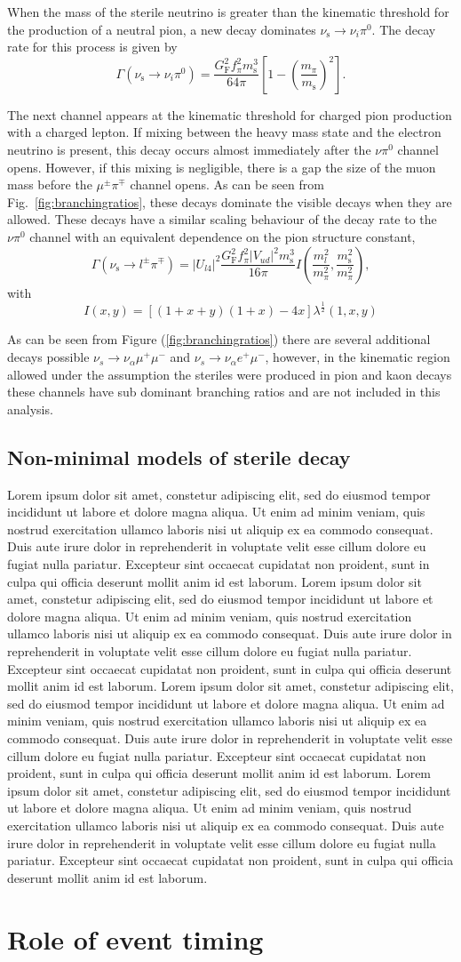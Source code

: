 \documentclass[11pt, a4paper]{article}
\newcommand{\reffig}[1]{Fig.~\ref{#1}}
\newcommand{\lorem}{ \textcolor[rgb]{0.8,0.8,0.8}{Lorem ipsum dolor sit amet, constetur
adipiscing elit, sed do eiusmod tempor incididunt ut labore et dolore magna
aliqua. Ut enim ad minim veniam, quis nostrud exercitation ullamco laboris nisi
ut aliquip ex ea commodo consequat. Duis aute irure dolor in reprehenderit in
voluptate velit esse cillum dolore eu fugiat nulla pariatur. Excepteur sint
occaecat cupidatat non proident, sunt in culpa qui officia deserunt mollit anim
id est laborum.}}
\begin{document}
When the mass of the sterile neutrino is greater than the kinematic threshold
for the production of a neutral pion, a new decay dominates
$\nu_\text{s}\to\nu_i \pi^0$. The decay rate for this process is given by
%
\[ \Gamma\left(\nu_\text{s} \to \nu_i \pi^0\right) =
\frac{G_\text{F}^2f_\pi^2m_\text{s}^3}{64\pi} \left[1-\left(
\frac{m_\pi}{m_\text{s}} \right)^2\right].  \]

The next channel appears at the kinematic threshold for charged pion production
with a charged lepton. If mixing between the heavy mass state and the electron
neutrino is present, this decay occurs almost immediately after the $\nu\pi^0$
channel opens. However, if this mixing is negligible, there is a gap the size of
the muon mass before the $\mu^\pm\pi^\mp$ channel opens. As can be seen from
\reffig{fig:branchingratios}, these decays dominate the visible decays when
they are allowed. These decays have a similar scaling behaviour of the decay
rate to the $\nu\pi^0$ channel with an equivalent dependence on the pion
structure constant,
%
\[ \Gamma\left(\nu_\text{s} \to l^\pm\pi^\mp\right) =
	\left|U_{l4}\right|^2\frac{G_\text{F}^2f_\pi^2 |V_{ud}|^2  m_\text{s}^3}{16\pi}I\left(\frac{m_l^2}{m_\pi^2} , \frac{m_\text{s}^2}{m_\pi^2}\right) ,
\]
with 
\[
	I(x,y) = \left[ \left( 1+x+y\right) \left(1+x\right) -4 x\right] \lambda^\frac{1}{2}\left(1,x,y\right)
\]

As can be seen from Figure (\ref{fig:branchingratios}) there are several additional decays possible $\nu_s \rightarrow \nu_\alpha \mu^+ \mu^-$ and $\nu_s \rightarrow \nu_\alpha e^+ \mu^-$, however, in the kinematic region allowed under the assumption the steriles were produced in pion and kaon decays these channels have sub dominant branching ratios and are not included in this analysis.

\subsection{Non-minimal models of sterile decay}

\lorem\lorem\lorem\lorem

\section{\label{sec:timing}Role of event timing}
\end{document}
